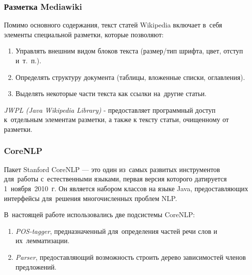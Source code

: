 \documentclass{beamer}
\begin{document}
\begin{frame}
\frametitle{Разметка Mediawiki}

Помимо основного содержания,
текст статей Wikipedia включает в~себя элементы специальной разметки, 
которые позволяют:

\begin{enumerate}

\item{Управлять внешним видом блоков текста (размер/тип шрифта, цвет, отступ и~т.~п.).}
\item{Определять структуру документа (таблицы, вложенные списки, оглавления).}
\item{Выделять некоторые части текста как ссылки на~другие статьи.}

\end{enumerate}

{\it JWPL (Java Wikipedia Library) } - 
предоставляет программный доступ к~отдельным элементам разметки,
а также к тексту статьи, очищенному от разметки.
\end{frame}




\begin{frame}
\frametitle{CoreNLP}
Пакет Stanford CoreNLP --- это один из~самых развитых инструментов для~работы с~естественными языками, 
первая версия которого датируется 1~ноября~2010~г.
Он является набором классов на языке Java, предоставляющих интерфейсы для~решения многочисленных проблем NLP. 

В~настоящей работе использовались две подсистемы CoreNLP:

\begin{enumerate}

\item {{\it POS-tagger}, предназначенный для~определения частей речи слов и их~лемматизации.}
\item {{\it Parser}, предоставляющий возможность строить дерево зависимостей членов предложений.}

\end{enumerate}

\end{frame}
\end{document}
